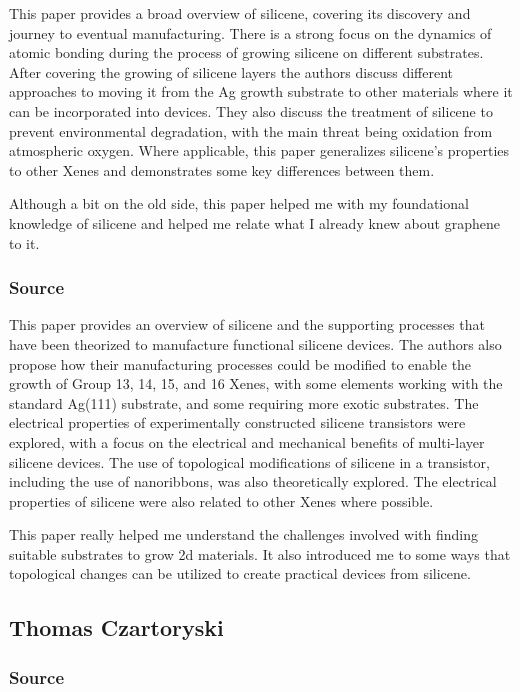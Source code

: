 \documentclass[conference]{IEEEtran}
\begin{document}
This paper provides a broad overview of silicene, covering its discovery and journey to eventual manufacturing. There is a strong focus on the dynamics of atomic bonding during the process of growing silicene on different substrates. After covering the growing of silicene layers the authors discuss different approaches to moving it from the Ag growth substrate to other materials where it can be incorporated into devices. They also discuss the treatment of silicene to prevent environmental degradation, with the main threat being oxidation from atmospheric oxygen. Where applicable, this paper generalizes silicene's properties to other Xenes and demonstrates some key differences between them.

Although a bit on the old side, this paper helped me with my foundational knowledge of silicene and helped me relate what I already knew about graphene to it.

\subsubsection{Source \cite{oc2}}

This paper provides an overview of silicene and the supporting processes that have been theorized to manufacture functional silicene devices. The authors also propose how their manufacturing processes could be modified to enable the growth of Group 13, 14, 15, and 16 Xenes, with some elements working with the standard Ag(111) substrate, and some requiring more exotic substrates. The electrical properties of experimentally constructed silicene transistors were explored, with a focus on the electrical and mechanical benefits of multi-layer silicene devices. The use of topological modifications of silicene in a transistor, including the use of nanoribbons, was also theoretically explored. The electrical properties of silicene were also related to other Xenes where possible.

	This paper really helped me understand the challenges involved with finding suitable substrates to grow 2d materials. It also introduced me to some ways that topological changes can be utilized to create practical devices from silicene.

\subsection{Thomas Czartoryski}

\subsubsection{Source \cite{tc6}}
\end{document}
